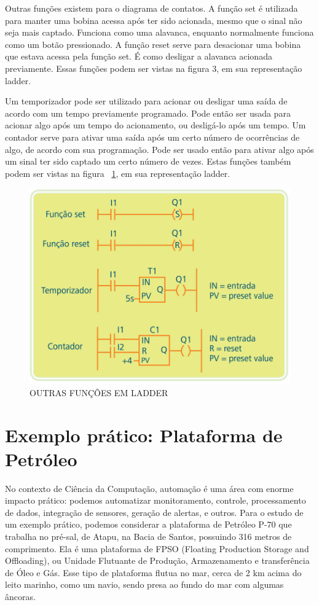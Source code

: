 \documentclass{article}
\begin{document}
Outras funções existem para o diagrama de contatos. A função set é utilizada para manter uma bobina acessa após ter sido acionada, mesmo que o sinal não seja mais captado. Funciona como uma alavanca, enquanto normalmente funciona como um botão pressionado. A função reset serve para desacionar uma bobina que estava acessa pela função set. É como desligar a alavanca acionada previamente. Essas funções podem ser vistas na figura 3, em sua representação ladder.  

Um temporizador pode ser utilizado para acionar ou desligar uma saída de acordo com um tempo previamente programado. Pode então ser usada para acionar algo após um tempo do acionamento, ou desligá-lo após um tempo. Um contador serve para ativar uma saída após um certo número de ocorrências de algo, de acordo com sua programação. Pode ser usado então para ativar algo após um sinal ter sido captado um certo número de vezes. Estas funções também podem ser vistas na figura ~\ref{fig:funcoes}, em sua representação ladder.

\begin{figure}[h]
    \centering
    \includegraphics[width=\textwidth]{imagens/funcextras.png}
    \caption{OUTRAS FUNÇÕES EM LADDER}
    \label{fig:funcoes}
\end{figure}


\section{Exemplo prático: Plataforma de Petróleo}
No contexto de Ciência da Computação, automação é uma área com enorme impacto prático: podemos automatizar monitoramento, controle, processamento de dados, integração de sensores, geração de alertas, e outros. Para o estudo de um exemplo prático, podemos considerar a plataforma de Petróleo P-70 que trabalha no pré-sal, de Atapu, na Bacia de Santos, possuindo 316 metros de comprimento. Ela é uma plataforma de FPSO (Floating Production Storage and Offloading), ou Unidade Flutuante de Produção, Armazenamento e transferência de Óleo e Gás. Esse tipo de plataforma flutua no mar, cerca de 2 km acima do leito marinho, como um navio, sendo presa ao fundo do mar com algumas âncoras.   
\end{document}
